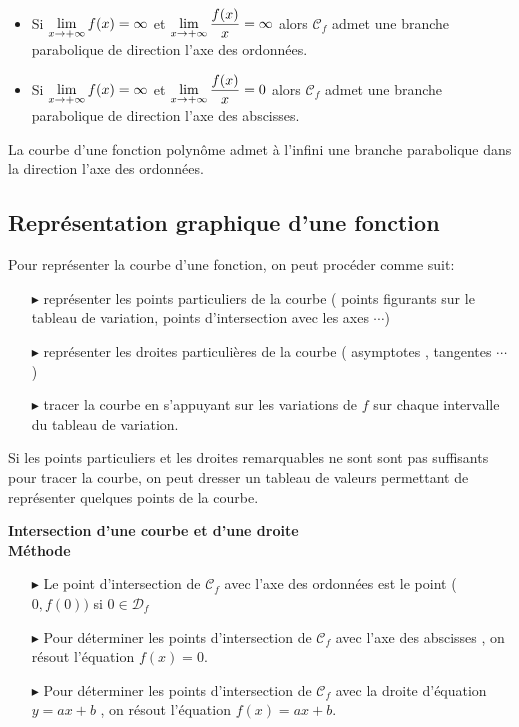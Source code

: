 \begin{property}

 \begin{itemize}
\item Si $\displaystyle \lim_{x\to +\infty} f(x) =\infty $ et $\displaystyle \lim_{x\to +\infty}{\dfrac{f(x)}{x} }=\infty $ alors $\mathscr{C}_{f}$  admet une branche parabolique de direction l'axe des ordonnées.
\item Si $\displaystyle \lim_{x\to +\infty} f(x) =\infty $ et $\displaystyle \lim_{x\to +\infty}{\dfrac{f(x)}{x} }=0 $ alors $\mathscr{C}_{f}$  admet une branche parabolique de direction l'axe des abscisses.
\end{itemize}
 

\end{property}
\begin{remark}

La courbe d'une fonction polynôme admet à l'infini une branche parabolique dans la direction l'axe des ordonnées.
\end{remark}



\subsection{Représentation graphique d'une fonction}
Pour représenter la  courbe d'une fonction, on peut procéder comme suit:
\begin{itemize}
\item[$  \blacktriangleright$] représenter les points particuliers de la courbe ( points figurants sur le tableau de variation, points d'intersection avec les axes $ \cdots $)
\item[$  \blacktriangleright$]représenter les droites particulières de la courbe ( asymptotes , tangentes $ \cdots $)
\item[$  \blacktriangleright$] tracer la courbe en s'appuyant  sur les variations de $ f $ sur chaque intervalle du tableau de variation.
\end{itemize}
\begin{remark}
Si les points particuliers et les droites remarquables  ne sont sont pas suffisants pour tracer la courbe, on peut dresser un tableau de valeurs permettant de représenter quelques points de la courbe.
\end{remark}
\textbf{Intersection d'une courbe et d'une droite}\\
\textbf{Méthode}
\begin{itemize}
\item[$  \blacktriangleright$]  Le point d'intersection de $ \mathcal{C}_{f} $  avec l'axe des ordonnées est le point ($ 0,f(0)) $  si $ 0\in \mathcal{D}_{f} $
\item[$  \blacktriangleright$]  Pour déterminer les points d'intersection de  $ \mathcal{C}_{f} $  avec l'axe des  abscisses , on résout l'équation $ f(x)=0. $
\item[$  \blacktriangleright$]   Pour déterminer les points d'intersection de  $ \mathcal{C}_{f} $  avec la droite d'équation $ y=ax+b $ , on résout l'équation $ f(x)=ax+b. $
\end{itemize}


